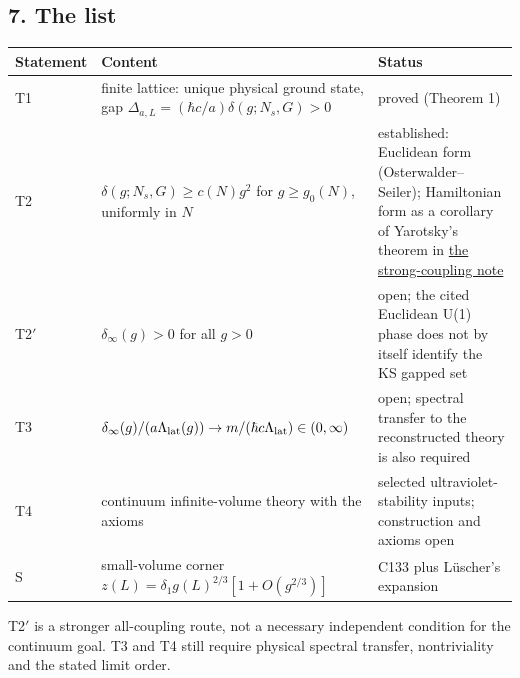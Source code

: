 \documentclass[11pt,a4paper]{article}
\begin{document}
\subsection{7. The list}\label{the-list}

\begin{longtable}[]{@{}
  >{\raggedright\arraybackslash}p{}
  >{\raggedright\arraybackslash}p{}
  >{\raggedright\arraybackslash}p{}@{}}
\toprule\noalign{}
\begin{minipage}[b]{\linewidth}\raggedright
Statement
\end{minipage} & \begin{minipage}[b]{\linewidth}\raggedright
Content
\end{minipage} & \begin{minipage}[b]{\linewidth}\raggedright
Status
\end{minipage} \\
\midrule\noalign{}
\endhead
\bottomrule\noalign{}
\endlastfoot
T1 & finite lattice: unique physical ground state, gap
\(\Delta_{a,L}=(\hbar c/a)\delta(g;N_s,G)>0\) & proved (Theorem 1) \\
T2 & \(\delta(g;N_s,G)\ge c(N)g^2\) for \(g\ge g_0(N)\), uniformly in
\(N\) & established: Euclidean form (Osterwalder--Seiler); Hamiltonian
form as a corollary of Yarotsky's theorem in
\href{strong-coupling-uniform-gap.md}{the strong-coupling note} \\
T2\('\) & \(\delta_\infty(g)>0\) for all \(g>0\) & open; the cited
Euclidean U(1) phase does not by itself identify the KS gapped set \\
T3 &
\(\delta_\infty(g)/(a\Lambda_{\rm lat}(g))\to m/(\hbar c\Lambda_{\rm lat})\in(0,\infty)\)
& open; spectral transfer to the reconstructed theory is also
required \\
T4 & continuum infinite-volume theory with the axioms & selected
ultraviolet-stability inputs; construction and axioms open \\
S & small-volume corner \(z(L)=\delta_1g(L)^{2/3}[1+O(g^{2/3})]\) & C133
plus Lüscher's expansion \\
\end{longtable}

T2\('\) is a stronger all-coupling route, not a necessary independent
condition for the continuum goal. T3 and T4 still require physical
spectral transfer, nontriviality and the stated limit order.
\end{document}
